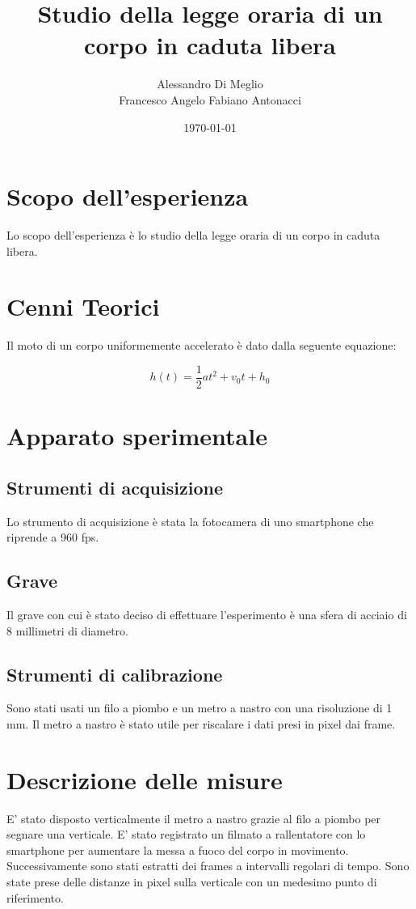 \documentclass{article}
\title{Studio della legge oraria di un corpo in caduta libera}
\author{Alessandro Di Meglio\\Francesco Angelo Fabiano Antonacci}
\date{\today}
\begin{document}
\maketitle

\section{Scopo dell'esperienza}
Lo scopo dell’esperienza è lo studio della legge oraria di un corpo in caduta libera.

\section {Cenni Teorici}
Il moto di un corpo uniformemente accelerato è dato dalla seguente equazione:

\begin{equation}
h(t)=\frac{1}{2}at^2+v_0t+h_0
\label{fond}
\end{equation}



\section{Apparato sperimentale}
\subsection{Strumenti di acquisizione}
Lo strumento di acquisizione è stata la fotocamera di uno smartphone che riprende a 960 fps.

\subsection{Grave}
Il grave con cui è stato deciso di effettuare l'esperimento è una sfera di acciaio di 8 millimetri di diametro.

\subsection{Strumenti di calibrazione}
Sono stati usati un filo a piombo e un metro a nastro con una risoluzione di 1 mm.
Il metro a nastro è stato utile per riscalare i dati presi in pixel dai frame.

\section{Descrizione delle misure}
E' stato disposto verticalmente il metro a nastro grazie al filo a piombo per segnare una verticale.
E' stato registrato un filmato a rallentatore con lo smartphone per aumentare la messa a fuoco del corpo in movimento.
Successivamente sono stati estratti dei frames a intervalli regolari di tempo.
Sono state prese delle distanze in pixel sulla verticale con un medesimo punto di riferimento.
\end{document}
